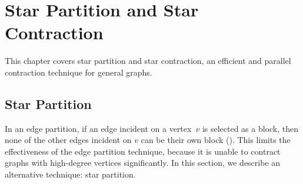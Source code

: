 \chapter{Star Partition and Star Contraction}
\label{ch:graphcon::star}

\begin{preamble}
This chapter covers star partition and star contraction, an
efficient and parallel contraction technique for general graphs. 
\end{preamble}

\section{Star Partition}
\label{sec:graphcon::star::partition}
\begin{gram}
In an edge partition, if an edge incident on a vertex~$v$ is selected
as a block, then none of the other edges incident on $v$ can be their
own block (). 
%
This limits the effectiveness of the edge partition technique, because
it is unable to contract graphs with high-degree vertices
significantly.
%
In this section, we describe an alternative technique: star partition.
\end{gram}

